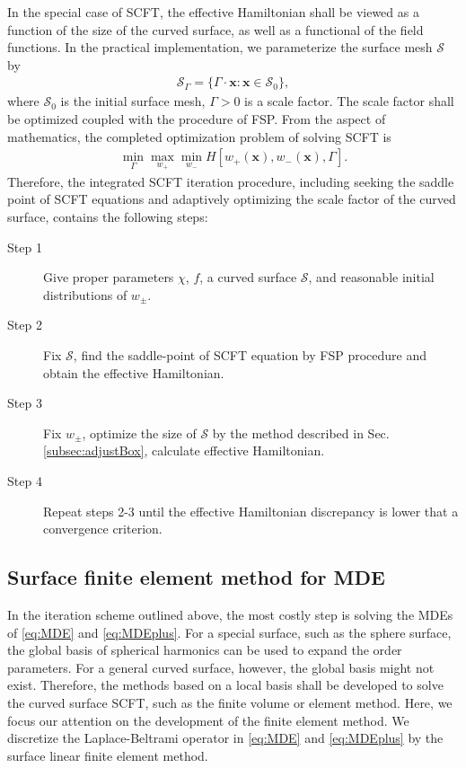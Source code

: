 \documentclass[final,1p,times]{elsarticle}
\newcommand{\bx}{\mathbf{x}}
\newcommand{\calS}{\mathcal{S}}
\begin{document}
In the special case of SCFT, the effective Hamiltonian shall be viewed as a
function of the size of the curved surface, as well as a functional of the
field functions.  In the practical implementation, we parameterize the surface
mesh $\mathcal{S}$ by 
\begin{align}
	\mathcal{S}_\Gamma=\{\Gamma\cdot\bx: \bx\in\mathcal{S}_0 \},
	\label{}
\end{align}
where $\calS_0$ is the initial surface mesh, $\Gamma>0$ is a scale factor.
The scale factor shall be optimized coupled with 
the procedure of FSP. From the aspect of mathematics, the
completed optimization problem of solving SCFT is 
\begin{align}
	\min_{\Gamma}\max_{w_+}\min_{w_-} H[w_+(\bx),
    w_-(\bx), \Gamma]. 
	\label{eq:scftOpt}
\end{align}
Therefore, the integrated SCFT iteration procedure, including seeking
the saddle point of SCFT equations and adaptively optimizing
the scale factor of the curved surface, contains the following steps:
\begin{description}
  \item[Step 1] Give proper parameters $\chi$, $f$, a curved
      surface $\calS$, and reasonable initial distributions of $w_{\pm}$.
  \item[Step 2] Fix $\mathcal{S}$, find the
	  saddle-point of SCFT equation by FSP procedure
	  and obtain the effective Hamiltonian.
  \item[Step 3] Fix $w_\pm$, optimize the size of $\mathcal{S}$ by the method described in
	  Sec.\,\ref{subsec:adjustBox}, calculate effective
	  Hamiltonian.
  \item[Step 4] Repeat steps 2-3 until the effective
	  Hamiltonian discrepancy is lower that a convergence
	  criterion.
\end{description}

\subsection{Surface finite element method for MDE}
\label{subsec:mde}


In the iteration scheme outlined above, the most costly step is solving the 
MDEs of \eqref{eq:MDE} and \eqref{eq:MDEplus}.  For a special
surface, such as the sphere surface, the global basis of spherical harmonics
can be used to expand the order parameters. For a general curved surface,
however, the global basis might not exist. Therefore, the methods based on a
local basis shall be developed to solve the curved surface SCFT, such as the
finite volume or element method. Here, we focus our attention on the
development of the finite element method. We discretize the Laplace-Beltrami
operator in \eqref{eq:MDE} and \eqref{eq:MDEplus} by the surface linear finite
element method.  
\end{document}
